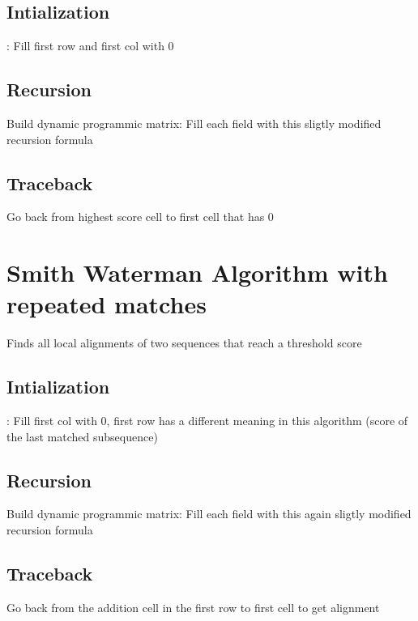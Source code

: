 \subsection{Intialization}:
Fill first row and first col with 0

\subsection{Recursion}
Build dynamic programmic matrix: Fill each field with this sligtly modified recursion formula

\subsection{Traceback}
Go back from highest score cell to first cell that has 0 



\section{Smith Waterman Algorithm with repeated matches}
Finds all local alignments of two sequences that reach a threshold score


\subsection{Intialization}:
Fill first col with 0, first row has a different meaning in this algorithm (score of the last matched subsequence)

\subsection{Recursion}
Build dynamic programmic matrix: Fill each field with this again sligtly modified recursion formula

\subsection{Traceback}
Go back from the addition cell in the first row to first cell to get alignment



